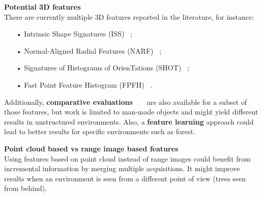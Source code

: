 \documentclass[a0paper,portrait]{baposter}
\begin{document}
\begin{poster}
{        \textbf{Potential 3D features}\\
        There are currently multiple 3D features reported in the literature, for instance:
        \begin{itemize}
            \item[•] Intrinsic Shape Signatures (ISS) ~\cite{Yu2009};
            \item[•] Normal-Aligned Radial Features (NARF) ~\cite{Steder2011};
            \item[•] Signatures of Histograms of OrienTations (SHOT) ~\cite{Tombari2010};
            \item[•] Fast Point Feature Histogram (FPFH) ~\cite{Rusu2009}.
        \end{itemize}
        Additionally, \textbf{comparative evaluations} ~\cite{Boyer2011} ~\cite{Filipe2014} are also available for a subset of those features, but work is limited to man-made objects and might yield different results in unstructured environments. Also, a \textbf{feature learning} approach could lead to better results for specific environments such as forest.\vspace{1em}

        \textbf{Point cloud based vs range image based features}\\
        Using features based on point cloud instead of range images could benefit from incremental information by merging multiple acquisitions. It might improve results when an environment is seen from a different point of view (trees seen from behind).
    }

\end{poster}
\end{document}
